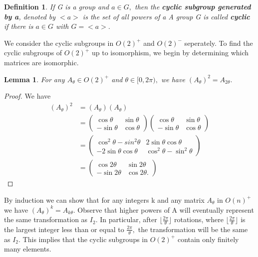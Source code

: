 \documentclass[a4 paper, 12pt]{article}
\newtheorem{lemma}[theorem]{Lemma}
\newtheorem{definition}[theorem]{Definition}
\begin{document}
	\begin{definition}
		If G is a group and $a\in G,$ then the \textbf{cyclic subgroup generated by a}, denoted by $<a>$ is the set of all powers of a A group G is called \textbf{cyclic} if there is $a \in G$ with $G = <a>.$
	\end{definition}
	
	\vspace{5mm}
	We consider the cyclic subgroups in $O(2)^+$ and $O(2)^-$ seperately. 
	To find the cyclic subgroups of $O(2)^+$ up to isomorphism, we begin by determining which matrices are isomorphic.
	\begin{lemma}
		For any $A_{\theta} \in O(2)^+$ and $\theta \in [0,2\pi),$ we have 
		$(A_\theta)^2 = A_{2\theta}.$
	\end{lemma}
	\begin{proof}
		We have
		\begin{align*}
			(A_\theta)^2 &= (A_\theta)(A_\theta)\\
			&= 
			\begin{pmatrix}
				\cos \theta & \sin \theta \\ 
				-\sin \theta & \cos \theta
			\end{pmatrix}
			\begin{pmatrix}
				\cos \theta & \sin \theta \\ 
				-\sin \theta & \cos \theta
			\end{pmatrix}\\
			&=
			\begin{pmatrix}
				\cos^2 \theta - sin^2 \theta & 2\sin \theta \cos \theta\\ 
				-2 \sin \theta \cos \theta & \cos^2 \theta -\sin^2 \theta
			\end{pmatrix}\\
			&=
			\begin{pmatrix}
				\cos 2\theta & \sin 2\theta \\
				-\sin 2 \theta & \cos 2\theta.
			\end{pmatrix}
		\end{align*}
	\end{proof}
	
	By induction we can show that for any integers k and any matrix $A_{\theta}$ in $O(n)^+$ we have $(A_\theta)^k = A_{k\theta}.$ Observe that higher powers of  A  will eventually represent the same transformation as $I_2.$ In particular, after $\lfloor\frac{2\pi}{\theta}\rfloor$ rotations, where $\lfloor\frac{2\pi}{\theta}\rfloor$ is the largest integer less than or equal to $\frac{2\pi}{\theta},$ the transformation will be the same as $I_2.$ This implies that the cyclic subgroups in $O(2)^+$ contain only finitely many elements.
	
\end{document}
